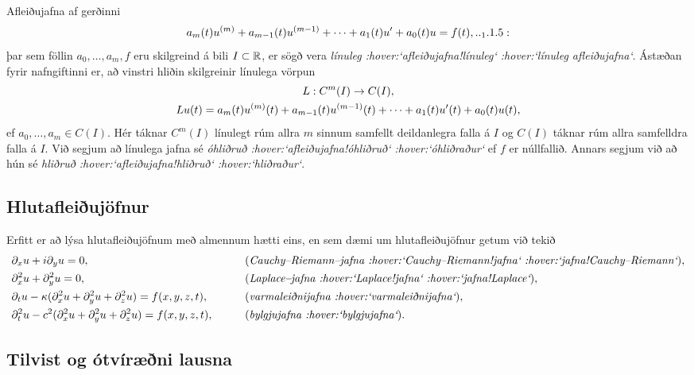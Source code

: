 Afleiðujafna af gerðinni 
 \begin{equation*}a_m(t)u\sp{(m)}+a_{m-1}(t)u\sp{(m-1)}+\cdots+a_1(t)u'+a_0(t)u=f(t),


.. _1.1.5:

 \end{equation*}
þar sem föllin $a_0,\dots,a_m,f$ eru skilgreind á bili $I\subset {\mathbb R}$,
er sögð vera {\it línuleg :hover:`afleiðujafna!línuleg` :hover:`línuleg
afleiðujafna`}.  Ástæðan
fyrir nafngiftinni er, að vinstri hliðin skilgreinir línulega vörpun
\begin{gather*}
L:C\sp m(I)\to C(I),\\
Lu(t)=
a_m(t)u\sp{(m)}(t)+a_{m-1}(t)u\sp{(m-1)}(t)+
\cdots+a_1(t)u'(t)+a_0(t)u(t),
\end{gather*}
ef $a_0,\dots,a_m\in C(I)$.
Hér táknar $C^m(I)$ línulegt rúm allra $m$ sinnum samfellt deildanlegra
falla á $I$ og $C(I)$ táknar rúm allra samfelldra falla á $I$.  
Við segjum að línulega jafna  sé {\it
óhliðruð :hover:`afleiðujafna!óhliðruð` :hover:`óhliðraður`} ef $f$ er núllfallið.
Annars segjum við að hún sé {\it
hliðruð :hover:`afleiðujafna!hliðruð` :hover:`hliðraður`}.  

\subsection*{Hlutafleiðujöfnur}

Erfitt er að lýsa hlutafleiðujöfnum 
með almennum hætti eins, en sem dæmi um hlutafleiðujöfnur
getum við tekið
\begin{alignat*}{2}
&\partial_xu+i\partial_yu=0,& \qquad
&\text{({\it
Cauchy--Riemann--jafna :hover:`Cauchy--Riemann!jafna`
 :hover:`jafna!Cauchy--Riemann`})},\\
&\partial_x\sp 2u+\partial_y\sp 2u=0,&\qquad
&\text{({\it Laplace--jafna :hover:`Laplace!jafna` :hover:`jafna!Laplace`})},\\
&\partial_tu-\kappa(\partial_x\sp 2u+\partial_y\sp 2u+\partial_z\sp
2u)=f(x,y,z,t),& \qquad
&\text{({\it varmaleiðnijafna :hover:`varmaleiðnijafna`})},\\
&\partial_t^2u-c^2(\partial_x\sp 2u+\partial_y\sp 2u+\partial_z\sp
2u)=f(x,y,z,t),& \qquad
&\text{({\it bylgjujafna :hover:`bylgjujafna`})}.
\end{alignat*}

\subsection*{Tilvist og ótvíræðni lausna}

